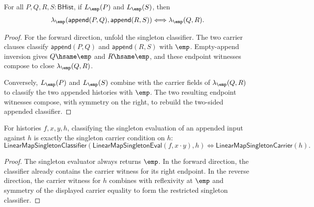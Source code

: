 \begin{theorem}
\label{thm:linearmap-singleton-classifier-append-two-sided-cancel}
For all $P,Q,R,S:\mathsf{BHist}$, if $L_{\emp}(P)$ and $L_{\emp}(S)$, then
$$
\lambda_{\emp}(\mathsf{append}(P,Q),\mathsf{append}(R,S))
\Longleftrightarrow
\lambda_{\emp}(Q,R).
$$
\end{theorem}
\begin{proof}
For the forward direction, unfold the singleton classifier. The two carrier
clauses classify $\mathsf{append}(P,Q)$ and $\mathsf{append}(R,S)$ with
$\emp$. Empty-append inversion gives $Q\hsame\emp$ and $R\hsame\emp$, and
these endpoint witnesses compose to close $\lambda_{\emp}(Q,R)$.

Conversely, $L_{\emp}(P)$ and $L_{\emp}(S)$ combine with the carrier fields of
$\lambda_{\emp}(Q,R)$ to classify the two appended histories with $\emp$.
The two resulting endpoint witnesses compose, with symmetry on the right, to
rebuild the two-sided appended classifier.
\end{proof}

\begin{theorem}
\label{thm:linearmap-singleton-eval-append-input-classifier}
For histories $f,x,y,h$, classifying the singleton evaluation of an appended
input against $h$ is exactly the singleton carrier condition on $h$:
$$
\mathsf{LinearMapSingletonClassifier}
  (\mathsf{LinearMapSingletonEval}(f,x\cdot y),h)
\Longleftrightarrow
\mathsf{LinearMapSingletonCarrier}(h).
$$
\end{theorem}
\begin{proof}
The singleton evaluator always returns $\emp$. In the forward direction, the
classifier already contains the carrier witness for its right endpoint. In the
reverse direction, the carrier witness for $h$ combines with reflexivity at
$\emp$ and symmetry of the displayed carrier equality to form the restricted
singleton classifier.
\end{proof}

